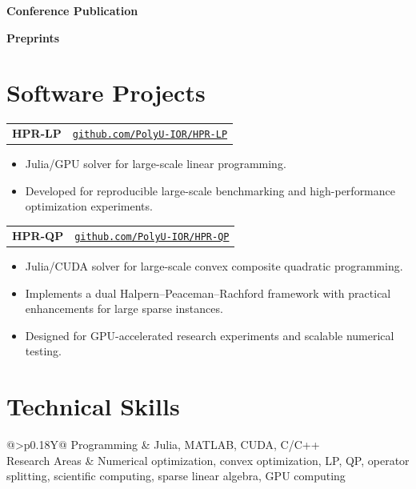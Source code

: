 \documentclass[11pt,a4paper]{article}
\makeatletter
\newcommand{\cvsubsection}[1]{%
    \vspace{0.15em}
    {\normalsize\bfseries\color{accent!90}#1}\par
    \vspace{0.2em}
}
\newcommand{\projectentry}[3]{%
    \begin{tabular*}{\textwidth}{@{\extracolsep{\fill}}lr@{}}
        \textbf{#1} & {\small\href{#2}{\nolinkurl{#3}}} \\
    \end{tabular*}
}
\makeatother
\begin{document}
\cvsubsection{Conference Publication}
\printbibliography[heading=none,type=inproceedings]

\cvsubsection{Preprints}
\printbibliography[heading=none,keyword=preprint]

\section*{Software Projects}
\projectentry{HPR-LP}{https://github.com/PolyU-IOR/HPR-LP}{github.com/PolyU-IOR/HPR-LP}
\begin{itemize}
    \item Julia/GPU solver for large-scale linear programming.
    \item Developed for reproducible large-scale benchmarking and high-performance optimization experiments.
\end{itemize}

\projectentry{HPR-QP}{https://github.com/PolyU-IOR/HPR-QP}{github.com/PolyU-IOR/HPR-QP}
\begin{itemize}
    \item Julia/CUDA solver for large-scale convex composite quadratic programming.
    \item Implements a dual Halpern--Peaceman--Rachford framework with practical enhancements for large sparse instances.
    \item Designed for GPU-accelerated research experiments and scalable numerical testing.
\end{itemize}

\section*{Technical Skills}
\begin{tabularx}{\textwidth}{@{}>{\bfseries}p{}Y@{}}
Programming & Julia, MATLAB, CUDA, C/C++ \\
Research Areas & Numerical optimization, convex optimization, LP, QP, operator splitting, scientific computing, sparse linear algebra, GPU computing \\
\end{tabularx}
\end{document}
